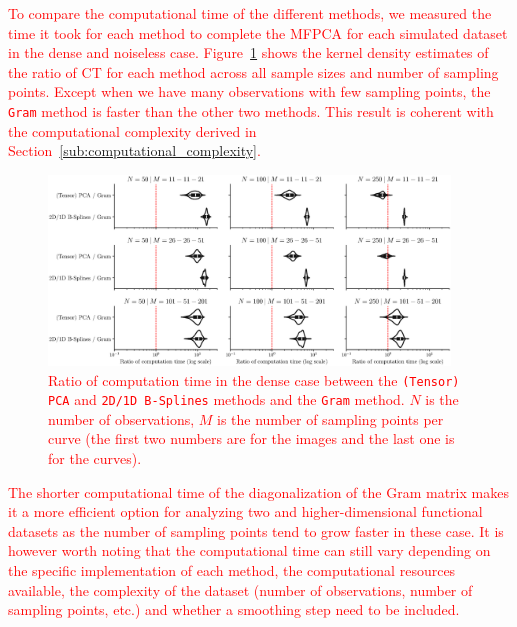 \begin{results}
\textcolor{red}{To compare the computational time of the different methods, we measured the time it took for each method to complete the MFPCA for each simulated dataset in the dense and noiseless case. Figure~\ref{fig:computation_time_mfd_1d} shows the kernel density estimates of the ratio of CT for each method across all sample sizes and number of sampling points. Except when we have many observations with few sampling points, the \texttt{Gram} method is faster than the other two methods. This result is coherent with the computational complexity derived in Section~\ref{sub:computational_complexity}.}

\begin{figure}
     \centering
    \includegraphics[width=0.95\textwidth]{figures/computation_time.eps}
    \caption{\textcolor{red}{Ratio of computation time in the dense case between the \texttt{(Tensor) PCA} and \texttt{2D/1D B-Splines} methods and the \texttt{Gram} method. $N$ is the number of observations, $M$ is the number of sampling points per curve (the first two numbers are for the images and the last one is for the curves).}}
    \label{fig:computation_time_mfd_1d}
\end{figure}

\textcolor{red}{The shorter computational time of the diagonalization of the Gram matrix makes it a more efficient option for analyzing two and higher-dimensional functional datasets as the number of sampling points tend to grow faster in these case. It is however worth noting that the computational time can still vary depending on the specific implementation of each method, the computational resources available, the complexity of the dataset (number of observations, number of sampling points, etc.) and whether a smoothing step need to be included.}
\end{results}

